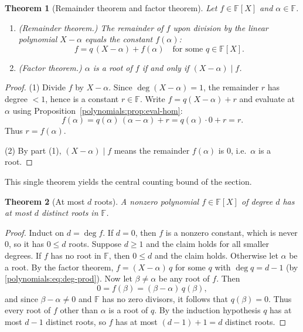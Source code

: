 \documentclass[11pt,a4paper]{article}
\newtheorem{theorem}{Theorem}[section]
\theoremstyle{definition}
\theoremstyle{remark}
\newcommand{\F}{\ensuremath{\mathbb{F}}}
\begin{document}
\begin{theorem}[Remainder theorem and factor theorem]\label{polynomials:thm:factor}
Let \(f \in \F[X]\) and \(\alpha \in \F\).
\begin{enumerate}
  \item \emph{(Remainder theorem.)} The remainder of \(f\) upon division by the
        linear polynomial \(X - \alpha\) equals the constant \(f(\alpha)\):
        \[
          f = q\,(X - \alpha) + f(\alpha)
          \quad\text{for some } q \in \F[X].
        \]
  \item \emph{(Factor theorem.)} \(\alpha\) is a root of \(f\) if and only if
        \((X - \alpha) \mid f\).
\end{enumerate}
\end{theorem}

\begin{proof}
(1) Divide \(f\) by \(X - \alpha\). Since \(\deg(X - \alpha) = 1\), the
remainder \(r\) has degree \(< 1\), hence is a constant \(r \in \F\). Write
\(f = q(X - \alpha) + r\) and evaluate at \(\alpha\) using
Proposition~\ref{polynomials:prop:eval-hom}:
\[
  f(\alpha) = q(\alpha)\,(\alpha - \alpha) + r = q(\alpha)\cdot 0 + r = r.
\]
Thus \(r = f(\alpha)\).

(2) By part (1), \((X - \alpha) \mid f\) means the remainder \(f(\alpha)\) is
\(0\), i.e.\ \(\alpha\) is a root.
\end{proof}

This single theorem yields the central counting bound of the section.

\begin{theorem}[At most \(d\) roots]\label{polynomials:thm:root-bound}
A nonzero polynomial \(f \in \F[X]\) of degree \(d\) has at most \(d\) distinct
roots in \(\F\).
\end{theorem}

\begin{proof}
Induct on \(d = \deg f\). If \(d = 0\), then \(f\) is a nonzero constant, which
is never \(0\), so it has \(0 \le d\) roots. Suppose \(d \ge 1\) and the claim
holds for all smaller degrees. If \(f\) has no root in \(\F\), then
\(0 \le d\) and the claim holds. Otherwise let \(\alpha\) be a root. By the
factor theorem, \(f = (X - \alpha)\, q\) for some \(q\) with
\(\deg q = d - 1\) (by \eqref{polynomials:eq:deg-prod}). Now let
\(\beta \neq \alpha\) be any root of \(f\). Then
\[
  0 = f(\beta) = (\beta - \alpha)\, q(\beta),
\]
and since \(\beta - \alpha \neq 0\) and \(\F\) has no zero divisors, it follows
that \(q(\beta) = 0\). Thus every root of \(f\) other than \(\alpha\) is a root
of \(q\). By the induction hypothesis \(q\) has at most \(d - 1\) distinct roots,
so \(f\) has at most \((d - 1) + 1 = d\) distinct roots.
\end{proof}
\end{document}
